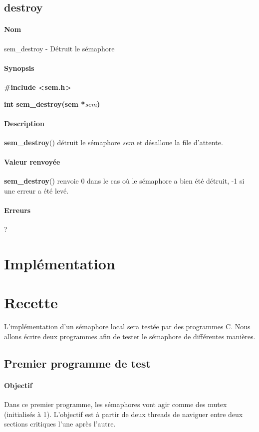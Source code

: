 \documentclass[12pt]{article}
\begin{document}
    \subsection{destroy}
        \paragraph{Nom\\}
        sem\_destroy - Détruit le sémaphore
        \paragraph{Synopsis\\}
        \textbf{\#include <sem.h>}

        \textbf{int sem\_destroy(sem *}\textit{sem}\textbf{)}
        \paragraph{Description\\}
        \textbf{sem\_destroy}() détruit le sémaphore \textit{sem} et désalloue la file d'attente.

        \paragraph{Valeur renvoyée\\}
        \textbf{sem\_destroy}() renvoie 0 dans le cas où le sémaphore a bien été détruit, -1 si une erreur a été levé.
        \paragraph{Erreurs\\}
        ?
    \newpage

\section{Implémentation}
\newpage
\section{Recette}
L'implémentation d'un sémaphore local sera testée par des programmes C. Nous allons écrire deux programmes afin de tester le sémaphore de différentes manières.
\subsection{Premier programme de test}
  \paragraph{Objectif\\}
  Dans ce premier programme, les sémaphores vont agir comme des mutex (initialisés à 1). L'objectif est à partir de deux threads de naviguer entre deux sections critiques l'une après l'autre.
\end{document}
